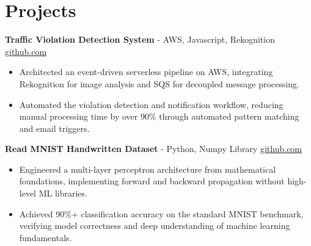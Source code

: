 \documentclass[11pt]{article}       %
\begin{document}

\vspace{-18.5pt}

\section*{Projects}

\textbf{Traffic Violation Detection System}{ - AWS, Javascript, Rekognition} \hfill \href{https://github.com/Monica20030707/AWS_rekonigition-N-read-database}{github.com} \\
\vspace{-9pt}
\begin{itemize}
  \item Architected an event-driven serverless pipeline on AWS, integrating Rekognition for image analysis and SQS for decoupled message processing.
  \item Automated the violation detection and notification workflow, reducing manual processing time by over 90\% through automated pattern matching and email triggers.
\end{itemize}

\textbf{Read MNIST Handwritten Dataset}{ - Python, Numpy Library} \hfill \href{https://github.com/Monica20030707/Artificial-Neutral-Network_ML}{github.com} \\
\vspace{-9pt}
\begin{itemize} 
  \item Engineered a multi-layer perceptron architecture from mathematical foundations, implementing forward and backward propagation without high-level ML libraries.
  \item Achieved 90\%+ classification accuracy on the standard MNIST benchmark, verifying model correctness and deep understanding of machine learning fundamentals.
\end{itemize}
\end{document}
